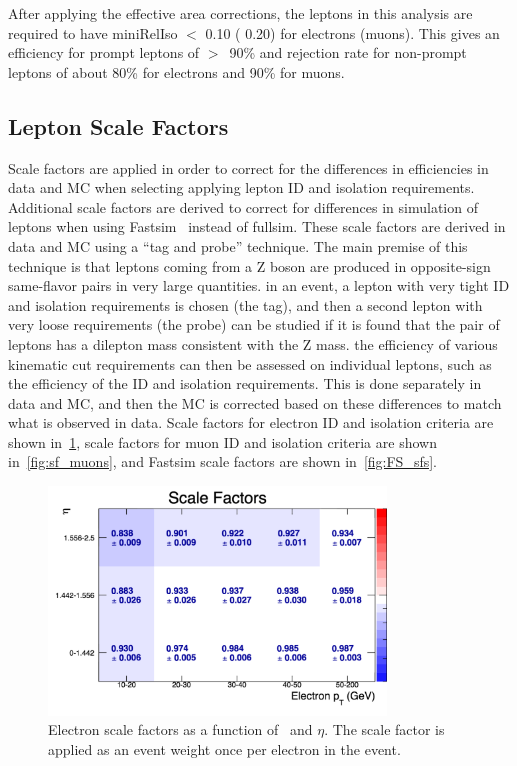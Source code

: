 After applying the effective area corrections,
the leptons in this analysis are required to have miniRelIso $<$ 0.10 ( 0.20) for electrons (muons). 
This gives an efficiency for prompt leptons of $>$~90\% and rejection rate for non-prompt leptons of about 80\% for electrons and 90\% for muons.
\clearpage

\subsection{Lepton Scale Factors}
\label{ssec:lepscalefactors}
Scale factors are applied in order to correct for the differences in efficiencies in data and MC when selecting applying lepton ID and isolation requirements.
Additional scale factors are derived to correct for differences in simulation of leptons when using Fastsim~\cite{fastsim} instead of fullsim.
These scale factors are derived in data and MC using a ``tag and probe'' technique.
The main premise of this technique is that leptons coming from a Z boson are produced in opposite-sign same-flavor pairs in very large quantities.
in an event, a lepton with very tight ID and isolation requirements is chosen (the tag),
and then a second lepton with very loose requirements (the probe) can be studied if it is found that the pair of leptons has a dilepton mass consistent with the Z mass.
the efficiency of various kinematic cut requirements can then be assessed on individual leptons, such as the efficiency of the ID and isolation requirements.
This is done separately in data and MC, and then the MC is corrected based on these differences to match what is observed in data.
Scale factors for electron ID and isolation criteria are shown in~\ref{fig:sf_electrons},
scale factors for muon ID and isolation criteria are shown in~\ref{fig:sf_muons},
and Fastsim scale factors are shown in~\ref{fig:FS_sfs}.
\begin{figure}[!ht]
  \begin{center}
      \includegraphics[width=0.8\textwidth]{evtsel/figs/sf_el_tight2d3d.pdf}  
    \caption{
      \label{fig:sf_electrons}
      Electron scale factors as a function of \pt\ and $\eta$.
      The scale factor is applied as an event weight once per electron in the event.
    }
  \end{center}
\end{figure}

